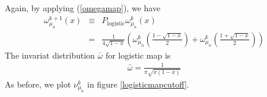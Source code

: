 \documentclass{article}
\begin{document}
Again, by applying (\ref{omegamap}), we have
 \begin{eqnarray}
 \label{logisticmapevolve}
    \omega_{\mu_n}^{k+1}(x) &\equiv &P_\text{logistic} \omega_{\mu_n}^{k}(x)\\
                            &     = &\frac{1}{4\sqrt{1-x}}\left( \omega_{\mu_n}^{k}\left( \frac{1-\sqrt{1-x}}{2}\right)
                                            +\omega_{\mu_n}^{k}\left( \frac{1+\sqrt{1-x}}{2}\right) \right)
 \end{eqnarray}
The invariat distribution $\bar{\omega}$ for logistic map is 
\begin{eqnarray} 
\label{logisticmapinvariant}
 \bar{\omega} = \frac{1}{\pi\sqrt{x(1-x)}}
\end{eqnarray}
As before, we plot $\nu_{\mu_n}^k$ in figure \ref{logisticmapcutoff}.
\end{document}
